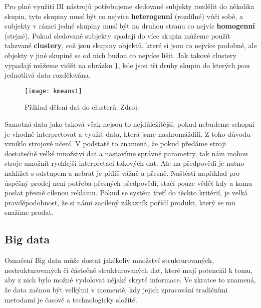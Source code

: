 \par Pro plné využití BI nástrojů potřebujeme sledované subjekty rozdělit do několika skupin, tyto skupiny musí být co nejvíce \textbf{heterogenní} (rozdílné) vůči sobě, a subjekty v rámci jedné skupiny musí být na druhou stranu co nejvíc \textbf{homogenní} (stejné). Pokud sledované subjekty spadají do více skupin můžeme použít takzvané \textbf{clustery}, což jsou skupiny objektů, které si jsou co nejvíce podobné, ale objekty v jiné skupině se od nich budou co nejvíce lišit. \cite{data-science-business} Jak takové clustery vypadají můžeme vidět na obrázku \ref{cluster-fig}, kde jsou tři druhy skupin do kterých jsou jednotlivá data rozdělována.

\begin{figure}[htp]
\centering
\texttt{[image: kmeans1]}
\caption[Příklad dělení dat do clusterů]{Příklad dělení dat do clusterů. Zdroj: \cite{data-science-business}}
\label{cluster-fig}
\end{figure}

\par Samotná data jako taková však nejsou to nejdůležitější, pokud nebudeme schopni je vhodně interpretovat a využít data, která jsme nashromáždili. Z toho důvodu vzniklo strojové učení. V podstatě to znamená, že pokud předáme stroji dostatečně velké množství dat a nastavíme správně parametry, tak nám mohou stroje umožnit rychlejší interpretaci takových dat. Ale na předpovědi je nutno nahlížet s odstupem a nebrat je příliš vážně a přesně. Naštěstí například pro úspěšný prodej není potřeba přesných předpovědí, stačí pouze vědět kdy a komu poslat přesně cílenou reklamu. Pokud se systém trefí do těchto kritérií, je velká pravděpodobnost, že si námi zacílený zákazník pořídí produkt, který se mu snažíme prodat. \cite{predictive-analytics}

\subsection{Big data} \label{big-data}
\par Označení Big data může dostat jakékoliv množství strukturovaných, nestrukturovaných či částečně strukturovaných dat, které mají potenciál k tomu, aby z nich bylo možné vydolovat nějaké skryté informace. Ve zkratce to znamená, že data začnou být velkými v momentě, kdy jejich zpracování tradičními metodami je časově a technologicky složité.\cite{big-data-anayitics}

